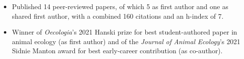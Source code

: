 


\begin{itemize}[noitemsep] 
  \item Published 14 peer-reviewed papers, of which 5 as first author and one as shared first author, with a combined 160 citations and an h-index of 7.
  \item Winner of \textit{Oecologia}'s 2021 Hanski prize for best student-authored paper in animal ecology (as first author) and of the \textit{Journal of Animal Ecology}'s 2021 Sidnie Manton award for best early-career contribution (as co-author).
\end{itemize}